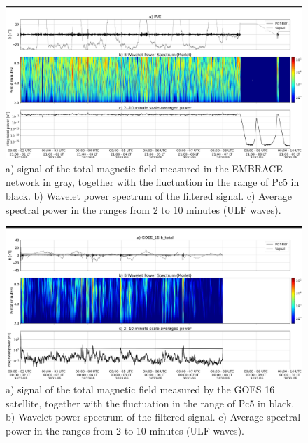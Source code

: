 \documentclass[a4paper, 10pt]{article}
\begin{document}
                     \begin{figure}[H]
    
                        \centering
   
                             \includegraphics[width=14cm]{./figures//figureULF_1.png}

                             \caption{a) signal of the total magnetic field 
                              measured in the EMBRACE network in gray, together with
                               the fluctuation in the range of Pc5 in black. b)
                                Wavelet power spectrum of the filtered signal. c) 
                                Average spectral power in the ranges from 2 to 10
                                 minutes (ULF waves).}
                        \end{figure}

                     \begin{figure}[H]
    
                        \centering
   
                             \includegraphics[width=14cm]{./figures//figureULF_2.png}

                             \caption{a) signal of the total magnetic field 
                              measured by the GOES 16 satellite, together with the 
                              fluctuation in the range of Pc5 in black. b) Wavelet 
                              power spectrum of the filtered signal. c) Average 
                              spectral power in the ranges from 2 to 10 minutes 
                              (ULF waves).}
                        \end{figure}
\end{document}
